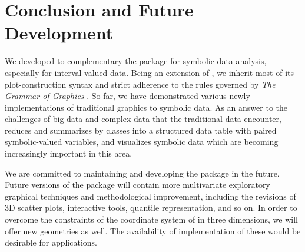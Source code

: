 \documentclass[article]{jss}
\begin{document}


\section{Conclusion and Future Development}

We developed  to complementary the  package for symbolic data analysis, especially for interval-valued data. Being an extension of , we inherit most of its plot-construction syntax and strict adherence to the rules governed by \emph{The Grammar of Graphics} \cite{wilkinson2012grammar}. So far, we have demonstrated various newly implementations of traditional graphics to symbolic data. As an answer to the challenges of big data and complex data that the traditional data encounter,  reduces and summarizes by classes into a structured data table with paired symbolic-valued variables, and visualizes symbolic data which are becoming increasingly important in this area.

We are committed to maintaining and developing the  package in the future. Future versions of the package will contain more multivariate exploratory graphical techniques and methodological improvement, including the revisions of 3D scatter plots, interactive tools, quantile representation, and so on. In order to overcome the constraints of the coordinate system of  in three dimensions, we will offer new geometries as well. The availability of implementation of these would be desirable for applications.











\end{document}
